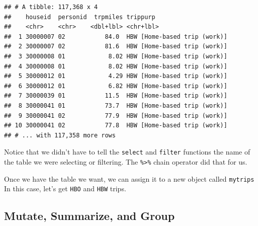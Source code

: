 \documentclass[
]{book}
\newenvironment{Shaded}{\begin{snugshade}}{\end{snugshade}}
\newcommand{\CommentTok}[1]{\textcolor[rgb]{0.56,0.35,0.01}{\textit{#1}}}
\newcommand{\KeywordTok}[1]{\textcolor[rgb]{0.13,0.29,0.53}{\textbf{#1}}}
\newcommand{\NormalTok}[1]{#1}
\newcommand{\OperatorTok}[1]{\textcolor[rgb]{0.81,0.36,0.00}{\textbf{#1}}}
\newcommand{\StringTok}[1]{\textcolor[rgb]{0.31,0.60,0.02}{#1}}
\begin{document}
\begin{Shaded}
\end{Shaded}

\begin{verbatim}
## # A tibble: 117,368 x 4
##    houseid  personid  trpmiles trippurp                    
##    <chr>    <chr>    <dbl+lbl> <chr+lbl>                   
##  1 30000007 02           84.0  HBW [Home-based trip (work)]
##  2 30000007 02           81.6  HBW [Home-based trip (work)]
##  3 30000008 01            8.02 HBW [Home-based trip (work)]
##  4 30000008 01            8.02 HBW [Home-based trip (work)]
##  5 30000012 01            4.29 HBW [Home-based trip (work)]
##  6 30000012 01            6.82 HBW [Home-based trip (work)]
##  7 30000039 01           11.5  HBW [Home-based trip (work)]
##  8 30000041 01           73.7  HBW [Home-based trip (work)]
##  9 30000041 02           77.9  HBW [Home-based trip (work)]
## 10 30000041 02           77.8  HBW [Home-based trip (work)]
## # ... with 117,358 more rows
\end{verbatim}

Notice that we didn't have to tell the \texttt{select} and \texttt{filter} functions the
name of the table we were selecting or filtering. The \texttt{\%\textgreater{}\%} chain operator did
that for us.

Once we have the table we want, we can assign it to a new object called \texttt{mytrips}
In this case, let's get \texttt{HBO} and \texttt{HBW} trips.

\begin{Shaded}
\end{Shaded}

\hypertarget{app-mutate}{%
\subsection{Mutate, Summarize, and Group}\label{app-mutate}}
\end{document}

